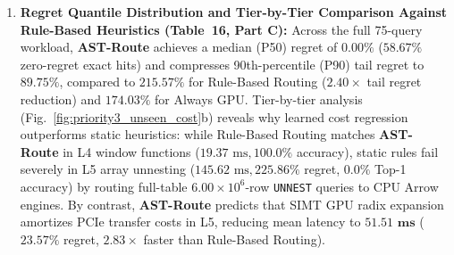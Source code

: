 \documentclass[10pt,a4paper]{article}
\begin{document}
\begin{enumerate}[leftmargin=1.5em,itemsep=2pt]
\item \textbf{Regret Quantile Distribution and Tier-by-Tier Comparison Against Rule-Based Heuristics (Table~16, Part C):} Across the full 75-query workload, \textbf{AST-Route} achieves a median (P50) regret of $\mathbf{0.00\%}$ ($58.67\%$ zero-regret exact hits) and compresses 90th-percentile (P90) tail regret to $\mathbf{89.75\%}$, compared to $215.57\%$ for Rule-Based Routing ($2.40\times$ tail regret reduction) and $174.03\%$ for Always GPU. Tier-by-tier analysis (Fig.~\ref{fig:priority3_unseen_cost}b) reveals why learned cost regression outperforms static heuristics: while Rule-Based Routing matches \textbf{AST-Route} in L4 window functions ($19.37\text{ ms}, 100.0\%$ accuracy), static rules fail severely in L5 array unnesting ($145.62\text{ ms}, 225.86\%$ regret, $0.0\%$ Top-1 accuracy) by routing full-table $6.00\times 10^6$-row \texttt{UNNEST} queries to CPU Arrow engines. By contrast, \textbf{AST-Route} predicts that SIMT GPU radix expansion amortizes PCIe transfer costs in L5, reducing mean latency to $\mathbf{51.51\text{ ms}}$ ($23.57\%$ regret, $\mathbf{2.83\times}$ faster than Rule-Based Routing).
\end{enumerate}
\end{document}
